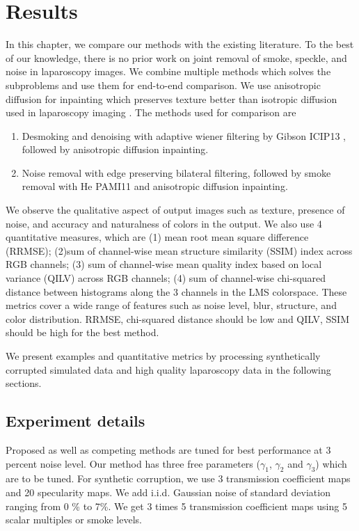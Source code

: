 \chapter{Results}

In this chapter, we compare our methods with the existing literature. To the best of our knowledge, there is no prior work on joint removal of smoke, speckle, and noise in laparoscopy images. We combine multiple methods which solves the subproblems and use them for end-to-end comparison. We use anisotropic diffusion for inpainting which preserves texture better than isotropic diffusion used in laparoscopy imaging \cite{saint2011detection, arnold2010speckle}. The methods used for comparison are
\begin{enumerate}
    \item Desmoking and denoising with adaptive wiener filtering by Gibson ICIP13 \cite{gibson2013wiener}, followed by anisotropic diffusion inpainting.
    \item Noise removal with edge preserving bilateral filtering, followed by smoke removal with He PAMI11 \cite{he2011dark} and anisotropic diffusion inpainting.
\end{enumerate}

We observe the qualitative aspect of output images such as texture, presence of noise, and accuracy and naturalness of colors in the output. We also use 4 quantitative measures, which are (1) mean root mean square difference (RRMSE); (2)sum of channel-wise mean structure similarity (SSIM) index across RGB channels; (3) sum of channel-wise mean quality index based on local variance (QILV) across RGB channels; (4) sum of channel-wise chi-squared distance between histograms along the 3 channels in the LMS colorspace. These metrics cover a wide range of features such as noise level, blur, structure, and color distribution. RRMSE, chi-squared distance should be low and QILV, SSIM should be high for the best method.

We present examples and quantitative metrics by processing synthetically corrupted simulated data and high quality laparoscopy data in the following sections.

\section{Experiment details}
Proposed as well as competing methods are tuned for best performance at 3 percent noise level. Our method has three free parameters ($\gamma_1$,  $\gamma_2$ and $\gamma_3$) which are to be tuned. For synthetic corruption, we use 3 transmission coefficient maps and 20 specularity maps. We add i.i.d. Gaussian noise of standard deviation ranging from 0 \% to 7\%. We get 3 times 5 transmission coefficient maps using 5 scalar multiples or smoke levels. 

